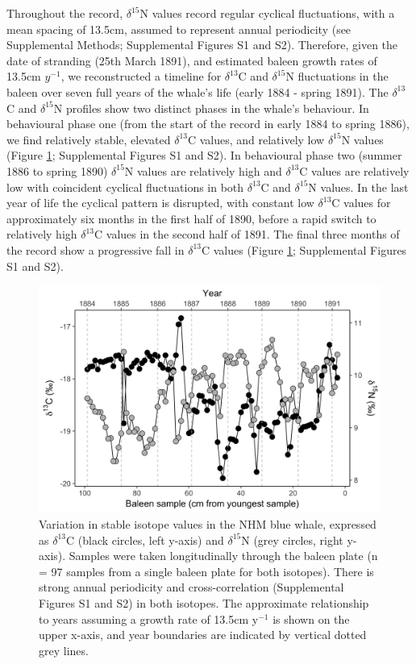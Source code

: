 \documentclass[a4paper,12pt]{article}
\begin{document}
Throughout the record, $\delta^{15}$N values record regular cyclical fluctuations, with a mean spacing of 13.5cm, assumed to represent annual periodicity (see Supplemental Methods; Supplemental Figures S1 and S2). 
Therefore, given the date of stranding (25th March 1891), and estimated baleen growth rates of 13.5cm $y^{-1}$, we reconstructed a timeline for $\delta^{13}$C and $\delta^{15}$N fluctuations in the baleen over seven full years of the whale's life (early 1884 - spring 1891). 
The $\delta^{13}$C and $\delta^{15}$N profiles show two distinct phases in the whale's behaviour. 
In behavioural phase one (from the start of the record in early 1884 to spring 1886), we find relatively stable, elevated $\delta^{13}$C values, and relatively low $\delta^{15}$N values (Figure \ref{fig1}; Supplemental Figures S1 and S2). 
In behavioural phase two (summer 1886 to spring 1890) $\delta^{15}$N values are relatively high and $\delta^{13}$C values are relatively low with coincident cyclical fluctuations in both $\delta^{13}$C and $\delta^{15}$N values. 
In the last year of life the cyclical pattern is disrupted, with constant low $\delta^{13}$C values for approximately six months in the first half of 1890, before a rapid switch to relatively high $\delta^{13}$C values in the second half of 1891. 
The final three months of the record show a progressive fall in $\delta^{13}$C values (Figure \ref{fig1}; Supplemental Figures S1 and S2).

\begin{figure}
  \centering
  \includegraphics[width = \linewidth]{figures/Figure-1-raw-dC-dN-data.png}
  \caption{Variation in stable isotope values in the NHM blue whale, expressed as $\delta^{13}$C (black circles, left y-axis) and $\delta^{15}$N (grey circles, right y-axis). Samples were taken longitudinally through the baleen plate (n = 97 samples from a single baleen plate for both isotopes). There is strong annual periodicity and cross-correlation (Supplemental Figures S1 and S2) in both isotopes. The approximate relationship to years assuming a growth rate of 13.5cm y$^{-1}$ is shown on the upper x-axis, and year boundaries are indicated by vertical dotted grey lines.}
  \label{fig1}
\end{figure}
\end{document}
